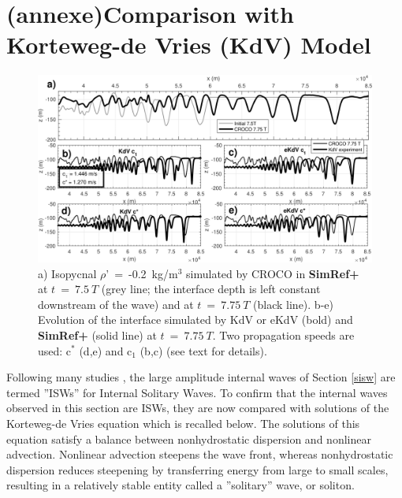 \section{(annexe)Comparison with Korteweg-de Vries (KdV) Model}
\label{KdVpart}
\begin{figure}[!h]
\centering
\includegraphics[width=1\linewidth]{./GBR2D/figure15.png}
\caption{ a) Isopycnal $\rho$'\ =\ -0.2\ kg/m$^3$ simulated by CROCO in \textbf{SimRef+} at $t\ =\ 7.5\ T$ (grey line; the interface depth is left constant downstream of the wave) and at $t\ =\ 7.75\ T$ (black line). b-e) Evolution of the interface simulated by KdV or eKdV (bold) and \textbf{SimRef+} (solid line) at $t\ =\ 7.75\ T$. Two propagation speeds are used: c$^*$ (d,e) and c$_1$ (b,c) (see text for details).}
\label{fig_kdv}
\end{figure}

Following many studies \citep{SG2008, Sannino2009b, Vlasenko2009}, the large amplitude internal waves of Section \ref{sisw} are termed ''ISWs'' for Internal Solitary Waves. To confirm that the internal waves observed in this section are ISWs, they are now compared with solutions of the Korteweg-de Vries equation which is recalled below. The solutions of this equation satisfy a balance between nonhydrostatic dispersion and nonlinear advection. Nonlinear advection steepens the wave front, whereas nonhydrostatic dispersion reduces steepening by transferring energy from large to small scales, resulting in a relatively stable entity called a ''solitary'' wave, or soliton.

